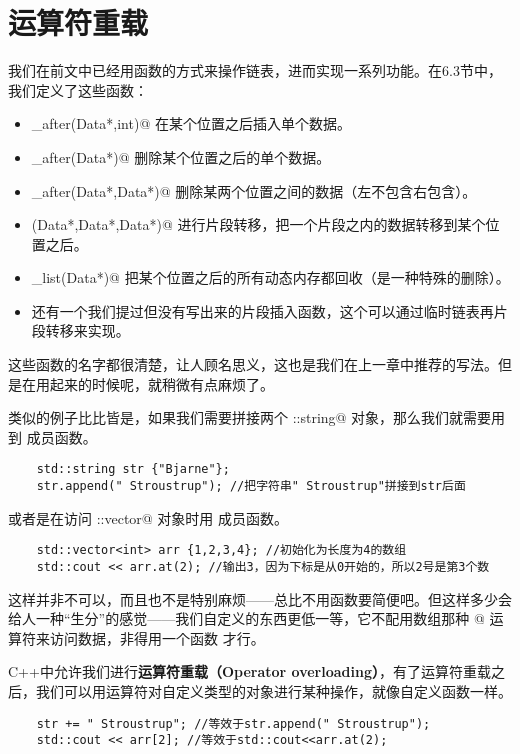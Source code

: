 \section{运算符重载}
我们在前文中已经用函数的方式来操作链表，进而实现一系列功能。在6.3节中，我们定义了这些函数：
\begin{itemize}
    \item \lstinline@insert_after(Data*,int)@ 在某个位置之后插入单个数据。
    \item \lstinline@delete_after(Data*)@ 删除某个位置之后的单个数据。
    \item \lstinline@delete_after(Data*,Data*)@ 删除某两个位置之间的数据（左不包含右包含）。
    \item \lstinline@transfer(Data*,Data*,Data*)@ 进行片段转移，把一个片段之内的数据转移到某个位置之后。
    \item \lstinline@clear_list(Data*)@ 把某个位置之后的所有动态内存都回收（是一种特殊的删除）。
    \item 还有一个我们提过但没有写出来的片段插入函数，这个可以通过临时链表再片段转移来实现。
\end{itemize}
这些函数的名字都很清楚，让人顾名思义，这也是我们在上一章中推荐的写法。但是在用起来的时候呢，就稍微有点麻烦了。\par
类似的例子比比皆是，如果我们需要拼接两个 \lstinline@std::string@ 对象，那么我们就需要用到 \lstinline@append@ 成员函数。
\begin{lstlisting}
    std::string str {"Bjarne"};
    str.append(" Stroustrup"); //把字符串" Stroustrup"拼接到str后面
\end{lstlisting}
或者是在访问 \lstinline@std::vector@ 对象时用 \lstinline@at@ 成员函数。
\begin{lstlisting}
    std::vector<int> arr {1,2,3,4}; //初始化为长度为4的数组
    std::cout << arr.at(2); //输出3，因为下标是从0开始的，所以2号是第3个数
\end{lstlisting}
这样并非不可以，而且也不是特别麻烦——总比不用函数要简便吧。但这样多少会给人一种``生分''的感觉——我们自定义的东西更低一等，它不配用数组那种 \lstinline@[]@ 运算符来访问数据，非得用一个函数 \lstinline@at@ 才行。\par
C++中允许我们进行\textbf{运算符重载（Operator overloading）}，有了运算符重载之后，我们可以用运算符对自定义类型的对象进行某种操作，就像自定义函数一样。
\begin{lstlisting}
    str += " Stroustrup"; //等效于str.append(" Stroustrup");
    std::cout << arr[2]; //等效于std::cout<<arr.at(2);
\end{lstlisting}\par
